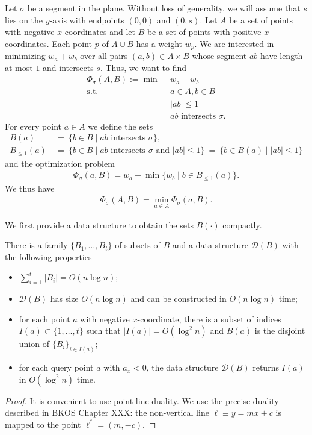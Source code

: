 \documentclass[a4paper,USenglish,numberwithinsect]{lipics}
\newcommand{\D}{\ensuremath{\mathcal{D}}}
\let\le\leqslant
\begin{document}
\begin{appendix}
Let $\sigma$ be a segment in the plane. 
Without loss of generality, we will assume that $s$ lies on
the $y$-axis with endpoints $(0,0)$ and $(0,s)$.
Let $A$ be a set of points with negative $x$-coordinates 
and let $B$ be a set of points with positive $x$-coordinates.
Each point $p$ of $A\cup B$ has a weight $w_p$.
We are interested in minimizing $w_a+w_b$ over all pairs $(a,b)\in A\times B$
whose segment $ab$ have length at most $1$ and intersects $s$.
Thus, we want to find
\begin{align*}
	\Phi_\sigma(A,B) :=\min ~~		& w_a+w_b\\
	 \mbox{s.t.}~~ & a\in A, b\in B\\
				&	|ab|\le 1\\
				&	\mbox{$ab$ intersects $\sigma$}. 
\end{align*}
For every point $a\in A$ we define the sets
\begin{align*}
	B(a)~&=~\{ b\in B\mid \text{$ab$ intersects $\sigma$}\},\\
	B_{\le 1}(a)~&=~ \{ b\in B\mid \text{$ab$ intersects $\sigma$ and $|ab|\le 1$}\} 
			~=~ \{ b\in B(a)\mid |ab|\le 1\}
\end{align*}
and the optimization problem
\begin{align*}
	\Phi_\sigma(a,B) = w_a + \min \{ w_b\mid b\in B_{\le 1}(a)\}.
\end{align*}
We thus have
\begin{align*}
	\Phi_\sigma(A,B) = \min_{a\in A} \Phi_\sigma(a,B).
\end{align*}

We first provide a data structure to obtain the sets $B(\cdot)$ compactly.
\begin{lemma}
\label{le:range}
	There is a family $\{ B_1,\dots, B_t\}$ of subsets of $B$
	and a data structure $\D (B)$ with the following properties
	\begin{itemize}
		\item $\sum_{i=1}^t |B_i| = O(n\log n)$;
		\item $\D (B)$ has size $O(n\log n)$ and can be constructed
			in $O(n\log n)$ time;
		\item for each point $a$ with negative $x$-coordinate, 
			there is a subset of indices 
			$I(a)\subset \{ 1,\dots,t\}$ such that $|I(a)|=O(\log^2 n)$ and
			$B(a)$ is the disjoint union of $\{ B_i \}_{i\in I(a)}$;
		\item for each query point $a$ with $a_x<0$, the data structure  $\D (B)$ returns $I(a)$
			in $O(\log^2 n)$ time.
	\end{itemize}
\end{lemma}
\begin{proof}
	It is convenient to use point-line duality. We use the precise duality
	described in BKOS Chapter XXX: the non-vertical line $\ell \equiv y=mx+c$
	is mapped to the point $\ell^*=(m,-c)$.
 

\end{proof}
\end{appendix}
\end{document}
